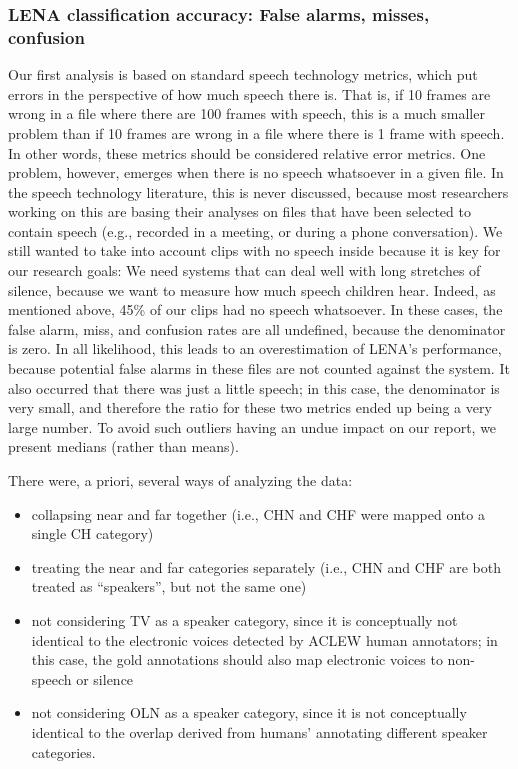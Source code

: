 \documentclass[english,floatsintext,man]{apa6}
\providecommand{\tightlist}{%
  \setlength{\itemsep}{0pt}\setlength{\parskip}{0pt}}
\begin{document}
\subsubsection{LENA classification accuracy: False alarms, misses,
confusion}\label{lena-classification-accuracy-false-alarms-misses-confusion}

Our first analysis is based on standard speech technology metrics, which
put errors in the perspective of how much speech there is. That is, if
10 frames are wrong in a file where there are 100 frames with speech,
this is a much smaller problem than if 10 frames are wrong in a file
where there is 1 frame with speech. In other words, these metrics should
be considered relative error metrics. One problem, however, emerges when
there is no speech whatsoever in a given file. In the speech technology
literature, this is never discussed, because most researchers working on
this are basing their analyses on files that have been selected to
contain speech (e.g., recorded in a meeting, or during a phone
conversation). We still wanted to take into account clips with no speech
inside because it is key for our research goals: We need systems that
can deal well with long stretches of silence, because we want to measure
how much speech children hear. Indeed, as mentioned above, 45\% of our
clips had no speech whatsoever. In these cases, the false alarm, miss,
and confusion rates are all undefined, because the denominator is zero.
In all likelihood, this leads to an overestimation of LENA's
performance, because potential false alarms in these files are not
counted against the system. It also occurred that there was just a
little speech; in this case, the denominator is very small, and
therefore the ratio for these two metrics ended up being a very large
number. To avoid such outliers having an undue impact on our report, we
present medians (rather than means).

There were, a priori, several ways of analyzing the data:

\begin{itemize}
\tightlist
\item
  collapsing near and far together (i.e., CHN and CHF were mapped onto a
  single CH category)
\item
  treating the near and far categories separately (i.e., CHN and CHF are
  both treated as \enquote{speakers}, but not the same one)
\item
  not considering TV as a speaker category, since it is conceptually not
  identical to the electronic voices detected by ACLEW human annotators;
  in this case, the gold annotations should also map electronic voices
  to non-speech or silence
\item
  not considering OLN as a speaker category, since it is not
  conceptually identical to the overlap derived from humans' annotating
  different speaker categories.
\end{itemize}
\end{document}
